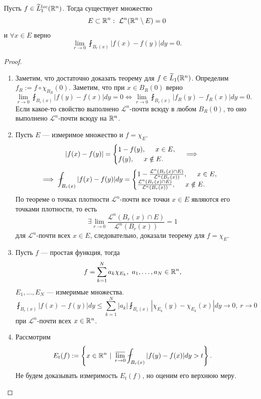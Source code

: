\begin{theorem}[Лебег]
    Пусть $f \in \widetilde{L}_1^{loc}(\mathbb{R}^n)$. Тогда существует множество 
    $$E \subset \mathbb{R}^n: \ \mathcal{L}^n(\mathbb{R}^n \setminus E) = 0$$
    и $\forall x \in E$ верно
    \[\lim\limits_{r\to 0} \fint_{B_r(x)} | f(x) - f(y)| dy = 0.\]
\end{theorem} 
\begin{proof}\tab
\begin{enumerate}
    \item Заметим, что достаточно доказать теорему для $f \in \widetilde{L}_1(\mathbb{R}^n)$.
    Определим $f_R:=f \circ \chi_{B_R}(0)$.
    Заметим, что при $x \in B_R(0)$ верно
    \[\lim\limits_{r\to 0}\fint_{B_r(x)}|f(y) - f(x)|dy=0 \Longleftrightarrow \lim\limits_{r\to 0} \fint_{B_r(x)} |f_R(y) - f_R(x)| dy = 0.\]
    Если какое-то свойство выполнено $\mathcal{L}^n$-почти всюду в любом $B_R(0)$, то оно выполнено $\mathcal{L}^n$-почти всюду на $\mathbb{R}^n$.
    \item Пусть $E$ — измеримое множество и $f = \chi_E$.
    \[|f(x)-f(y)| = 
    \begin{cases}
        1-f(y), \hspace*{.5cm} x \in E, \\
        f(y), \hspace*{.5cm} x \notin E.
    \end{cases}
    \implies
    \]
    \[\implies \fint_{B_r(x)} |f(x) - f(y)|dy = 
    \begin{cases}
        1 - \frac{\mathcal{L}^n(B_r(x) \cap E)}{\mathcal{L}^n(B_r(x))}, \tab x \in E, \\
        \frac{\mathcal{L}^n(B_r(x) \cap E)}{\mathcal{L}^n(B_r(x))}, \tab x \notin E.
    \end{cases}
    \]
    По теореме о точках плотности $\mathcal{L}^n$-почти все точки $x \in E$ являются его точками плотности, то есть
    \[\exists \lim\limits_{r\to 0} \frac{\mathcal{L}^n(B_r(x) \cap E)}{\mathcal{L}^n(B_r(x))} = 1\]
    для $\mathcal{L}^n$-почти всех $x \in E$, следовательно, доказали теорему для $f = \chi_E$.
    \item Пусть $f$ — простая функция, тогда
    \[f = \sum\limits_{k=1}^{N}a_k \chi_{E_k}, \ a_1, \dots, a_N \in \mathbb{R}^n,\]
    $E_1, \dots, E_N$ — измеримые множества.
    \[\fint_{B_r(x)} |f(x) - f(y)|dy 
    \leqslant
    \sum\limits_{k=1}^{N}|a_k| \fint_{B_r(x)} |\chi_{E_k}(y) - \chi_{E_k}(x)| dy \to 0, \ r \to 0\]
    при $\mathcal{L}^n$-почти всех $x \in \mathbb{R}^n$.
    \item Рассмотрим
    \[E_t(f) := \left\{x \in \R^n \ | \ \uplim\limits_{r \to 0}\fint_{B_r(x)} |f(y) - f(x)| dy > t\right\}.\]
    Не будем доказывать измеримость $E_t(f)$, но оценим его верхнюю меру.

\end{enumerate}
\end{proof}
